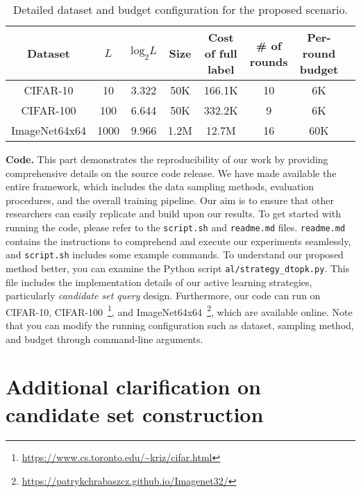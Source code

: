 \begin{table}[h!]
    \caption{Detailed dataset and budget configuration for the proposed scenario.}
    \label{tab:budget_cost}
    \begin{center}
        \begin{small}
            \setlength\tabcolsep{6pt}
            \centering
            \begin{tabular}{cccccccc}
                \toprule
                Dataset & $L$ & $\text{log}_2{L}$ & Size & Cost of full label & \# of rounds & Per-round budget \\ \midrule
                CIFAR-10      & 10   & 3.322 & 50K     & 166.1K   & 10 & 6K  \\
                CIFAR-100     & 100  & 6.644 & 50K     & 332.2K   & 9 & 6K  \\
                ImageNet64x64 & 1000 & 9.966 & 1.2M & 12.7M & 16 & 60K \\
                \bottomrule
            \end{tabular}
        \end{small}
    \end{center}
\end{table}


\noindent\textbf{Code.}
This part demonstrates the reproducibility of our work by providing comprehensive details on the source code release. We have made available the entire framework, which includes the data sampling methods, evaluation procedures, and the overall training pipeline. Our aim is to ensure that other researchers can easily replicate and build upon our results. To get started with running the code, please refer to the \verb|script.sh| and \verb|readme.md| files. 
\verb|readme.md| contains the instructions to comprehend and execute our experiments seamlessly, and \verb|script.sh| includes some example commands. 
To understand our proposed method better, you can examine the Python script \verb|al/strategy_dtopk.py|. This file includes the implementation details of our active learning strategies, particularly \emph{candidate set query} design. Furthermore, our code can run on CIFAR-10, CIFAR-100~\footnote{\url{https://www.cs.toronto.edu/~kriz/cifar.html}}, and ImageNet64x64~\footnote{\url{https://patrykchrabaszcz.github.io/Imagenet32/}}, which are available online. Note that you can modify the running configuration such as dataset, sampling method, and budget through command-line arguments.

\section{Additional clarification on candidate set construction}
\label{sec:clarification}

